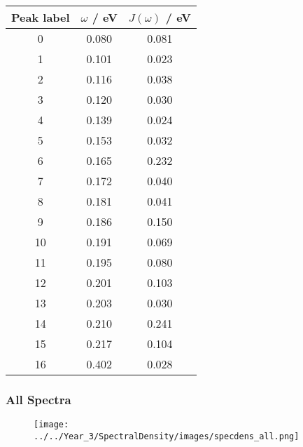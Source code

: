 \begin{table}
    \centering
    \begin{tabular}{||c c c||}
    \hline
    Peak label & $\omega$ / eV & $J\left(\omega\right)$ / eV \\
    \hline\hline
    
     0 & 0.080 & 0.081 \\
     1 & 0.101 & 0.023 \\
     2 & 0.116 & 0.038 \\
     3 & 0.120 & 0.030 \\
     4 & 0.139 & 0.024 \\
     5 & 0.153 & 0.032 \\
     6 & 0.165 & 0.232 \\
     7 & 0.172 & 0.040 \\
     8 & 0.181 & 0.041 \\
     9 & 0.186 & 0.150 \\
     10 & 0.191 & 0.069 \\
     11 & 0.195 & 0.080 \\
     12 & 0.201 & 0.103 \\
     13 & 0.203 & 0.030 \\
     14 & 0.210 & 0.241 \\
     15 & 0.217 & 0.104 \\
     16 & 0.402 & 0.028 \\
    \hline 
    \end{tabular}
    \end{table}

\afterpartskip
\subsubsection{All Spectra}
\label{subsubsec:specdens_stacked}

\begin{figure}
    \centering
    \texttt{[image: ../../Year\_3/SpectralDensity/images/specdens\_all.png]}
\end{figure}

